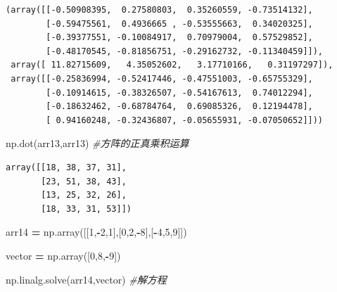\documentclass[]{article}
\newenvironment{Shaded}{\begin{snugshade}}{\end{snugshade}}
\newcommand{\DecValTok}[1]{\textcolor[rgb]{0.00,0.00,0.81}{#1}}
\newcommand{\CommentTok}[1]{\textcolor[rgb]{0.56,0.35,0.01}{\textit{#1}}}
\newcommand{\OperatorTok}[1]{\textcolor[rgb]{0.81,0.36,0.00}{\textbf{#1}}}
\newcommand{\NormalTok}[1]{#1}
\begin{document}
\begin{verbatim}
(array([[-0.50908395,  0.27580803,  0.35260559, -0.73514132],
        [-0.59475561,  0.4936665 , -0.53555663,  0.34020325],
        [-0.39377551, -0.10084917,  0.70979004,  0.57529852],
        [-0.48170545, -0.81856751, -0.29162732, -0.11340459]]),
 array([ 11.82715609,   4.35052602,   3.17710166,   0.31197297]),
 array([[-0.25836994, -0.52417446, -0.47551003, -0.65755329],
        [-0.10914615, -0.38326507, -0.54167613,  0.74012294],
        [-0.18632462, -0.68784764,  0.69085326,  0.12194478],
        [ 0.94160248, -0.32436807, -0.05655931, -0.07050652]]))
\end{verbatim}

\begin{Shaded}
\begin{Highlighting}[]
\NormalTok{np.dot(arr13,arr13) }\CommentTok{#方阵的正真乘积运算}
\end{Highlighting}
\end{Shaded}

\begin{verbatim}
array([[18, 38, 37, 31],
       [23, 51, 38, 43],
       [13, 25, 32, 26],
       [18, 33, 31, 53]])
\end{verbatim}

\begin{Shaded}
\begin{Highlighting}[]
\NormalTok{arr14 }\OperatorTok{=}\NormalTok{ np.array([[}\DecValTok{1}\NormalTok{,}\OperatorTok{-}\DecValTok{2}\NormalTok{,}\DecValTok{1}\NormalTok{],[}\DecValTok{0}\NormalTok{,}\DecValTok{2}\NormalTok{,}\OperatorTok{-}\DecValTok{8}\NormalTok{],[}\OperatorTok{-}\DecValTok{4}\NormalTok{,}\DecValTok{5}\NormalTok{,}\DecValTok{9}\NormalTok{]])}
\end{Highlighting}
\end{Shaded}

\begin{Shaded}
\begin{Highlighting}[]
\NormalTok{vector }\OperatorTok{=}\NormalTok{ np.array([}\DecValTok{0}\NormalTok{,}\DecValTok{8}\NormalTok{,}\OperatorTok{-}\DecValTok{9}\NormalTok{])}
\end{Highlighting}
\end{Shaded}

\begin{Shaded}
\begin{Highlighting}[]
\NormalTok{np.linalg.solve(arr14,vector) }\CommentTok{#解方程}
\end{Highlighting}
\end{Shaded}
\end{document}
